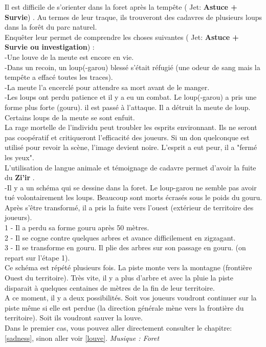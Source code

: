 \documentclass[oneside,12pt]{book}
\newcommand\roll[1]{
( Jet: \textbf{#1})
}
\newcommand{\Thomas}{\textbf{Zi'ir} }
\begin{document}
\begin{flushleft}
Il est difficile de s'orienter dans la foret après la tempête \roll{Astuce + Survie}. 
Au termes de leur traque, ils trouveront des cadavres de plusieurs loups dans la forêt du parc naturel. \\
Enquêter leur permet de comprendre les choses suivantes \roll{Astuce + Survie ou investigation} : \\

-Une louve de la meute est encore en vie.\\
-Dans un recoin, un loup(-garou) blessé s'était réfugié (une odeur de sang mais la tempête a effacé toutes les traces).\\ 
-La meute l'a encerclé pour attendre sa mort avant de le manger.\\
-Les loups ont perdu patience et il y a eu un combat. Le loup(-garou) a pris une forme plus forte (gouru). 
il est passé à l'attaque. Il a détruit la meute de loup. Certains loups de la meute se sont enfuit. \\

La rage mortelle de l'individu peut troubler les esprits environnant. 
Ils ne seront pas coopératif et critiqueront l'efficacité des joueurs. 
Si un don quelconque est utilisé pour revoir la scène, l'image devient noire. L'esprit a eut peur, il a "fermé les yeux".\\
L'utilisation de langue animale et témoignage de cadavre permet d'avoir la fuite du \Thomas.\\
-Il y a un schéma qui se dessine dans la foret. Le loup-garou ne semble pas avoir tué volontairement les loups. 
Beaucoup sont morts écrasés sous le poids du gouru. 
Après s’être transformé, il a pris la fuite vers l'ouest (extérieur de territoire des joueurs). \\
1 - Il a perdu sa forme gouru après 50 mètres.\\
2 - Il se cogne contre quelques arbres et avance difficilement en zigzagant.\\
3 - Il se transforme en gouru. Il plie des arbres sur son passage en gouru. (on repart sur l'étape 1).\\
Ce schéma est répété plusieurs fois. La piste monte vers la montagne (frontière Ouest du territoire). Très vite, il y a plus d'arbre et avec la pluie la piste disparait à quelques centaines de mètres de la fin de leur territoire. \\

A ce moment, il y a deux possibilités. Soit vos joueurs voudront continuer sur la piste même si elle est perdue (la direction générale mène vers la frontière du territoire). Soit ils voudront sauver la louve.\\
Dans le premier cas, vous pouvez aller directement consulter le chapitre: \ref{sadness}, sinon aller voir \ref{louve}.
\textit{Musique : Foret }




\end{flushleft}
\end{document}

